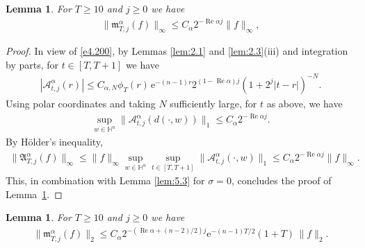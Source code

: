 \documentclass[11pt]{amsproc}
\newcommand{\e}{\mathrm{e}}
\newcommand{\fm}{\mathfrak{m}}
\newcommand{\0}{\mathbf{0}}
\newcommand{\CK}{\mathscr{A}}
\renewcommand{\Re}{\mathop{\mathrm{Re}}}
\renewcommand{\H}{\mathbb{H}}
\renewcommand{\d}{\mathrm{d}}
\numberwithin{equation}{section}
\numberwithin{figure}{section}
\newtheorem{lem}[thm]{Lemma}
\theoremstyle{definition}
\theoremstyle{remark}
\numberwithin{thm}{section}
\begin{document}
\begin{lem}\label{lem:5.4}
For $T\geq 10$ and $j\geq 0$ we have
\begin{eqnarray*}
\|\fm^\alpha_{T,j}(f)\|_\infty\leq C_{\alpha}2^{-\Re\alpha j}\|f\|_\infty,
\end{eqnarray*}
\end{lem}

\begin{proof}
In view of \eqref{e4.200}, by Lemmas \ref{lem:2.1} and \ref{lem:2.3}(iii) and integration by parts, for $t\in[T,T+1]$ we have
\begin{eqnarray*}
|\CK^\alpha_{t,j}(r)|\leq C_{\alpha,N}\phi_T(r)\,\e^{-(n-1)r}2^{(1-\Re\alpha)j}(1+2^j|t-r|)^{-N}.
\end{eqnarray*}
Using polar coordinates and taking $N$ sufficiently large, for $t$ as above, we have
\begin{eqnarray*}
\sup_{w\in\H^n}\|\CK^\alpha_{t,j}(d(\cdot,w))\|_1
\leq  C_{\alpha}2^{-\Re\alpha j}.
\end{eqnarray*}
By H\"{o}lder's inequality,
\begin{eqnarray*}
\|{\mathfrak A}^\alpha_{T,j}(f)\|_\infty
\leq  \|f\|_\infty\sup_{w\in \H^n}\sup_{t\in[T,T+1]}\|\CK^\alpha_{t,j}(\cdot,w)\|_1\leq C_{\alpha}2^{-\Re\alpha j}\|f\|_\infty.
\end{eqnarray*}
This,  in combination with 
Lemma \ref{lem:5.3} for $\sigma=0$, %
concludes 
the proof of Lemma~\ref{lem:5.4}.
\end{proof}

\begin{lem}\label{lem:5.5}
For $T\geq 10$ and $j\geq 0$ we have
\begin{eqnarray*}
\|\fm^\alpha_{T,j}(f)\|_2\leq C_{\alpha}2^{-(\Re\alpha+(n-2)/2)j}\e^{-(n-1)T/2}(1+T)\,\|f\|_2.
\end{eqnarray*}
\end{lem}
\end{document}
